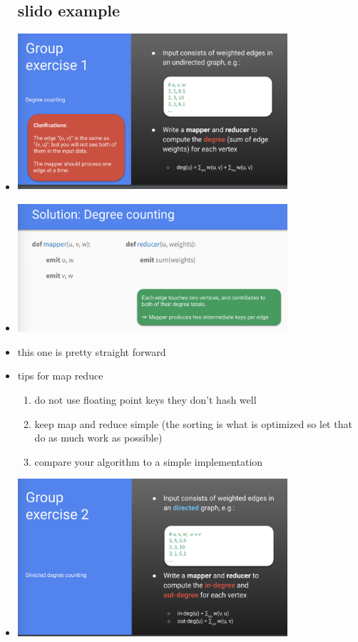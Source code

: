 \documentclass{article}
\begin{document}
\begin{itemize}
\subsection*{slido example}
\item \includegraphics[width=10cm]{images/Screenshot 2023-05-08 at 4.59.20 PM.png}
\item \includegraphics[width=10cm]{images/Screenshot 2023-05-08 at 5.03.47 PM.png}
\item this one is pretty straight forward
\item tips for map reduce 
\begin{enumerate}
    \item do not use floating point keys they don't hash well 
    \item keep map and reduce simple (the sorting is what is optimized so let that do as much work as possible)
    \item compare your algorithm to a simple implementation
\end{enumerate}
\item \includegraphics[width=10cm]{images/Screenshot 2023-05-08 at 5.07.04 PM.png}

\end{itemize}
\end{document}
